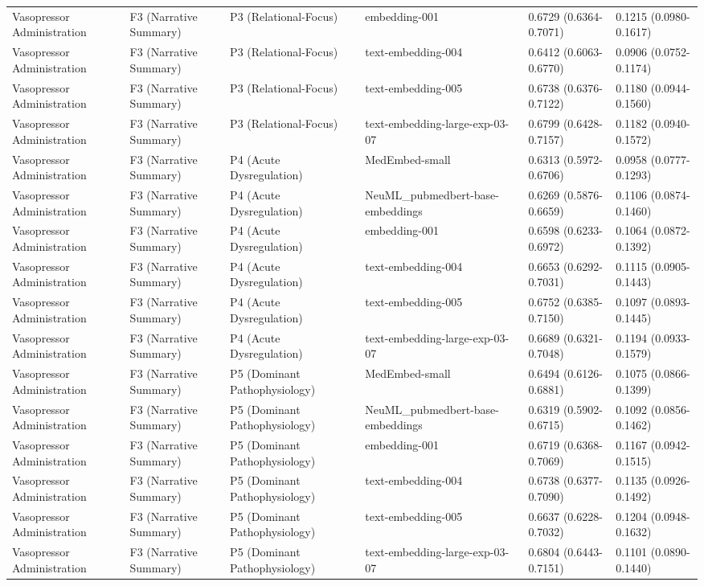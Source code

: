 \begin{tabular}{llllll}
Vasopressor Administration & F3 (Narrative Summary) & P3 (Relational-Focus) & embedding-001 & 0.6729 (0.6364-0.7071) & 0.1215 (0.0980-0.1617) \\
Vasopressor Administration & F3 (Narrative Summary) & P3 (Relational-Focus) & text-embedding-004 & 0.6412 (0.6063-0.6770) & 0.0906 (0.0752-0.1174) \\
Vasopressor Administration & F3 (Narrative Summary) & P3 (Relational-Focus) & text-embedding-005 & 0.6738 (0.6376-0.7122) & 0.1180 (0.0944-0.1560) \\
Vasopressor Administration & F3 (Narrative Summary) & P3 (Relational-Focus) & text-embedding-large-exp-03-07 & 0.6799 (0.6428-0.7157) & 0.1182 (0.0940-0.1572) \\
Vasopressor Administration & F3 (Narrative Summary) & P4 (Acute Dysregulation) & MedEmbed-small & 0.6313 (0.5972-0.6706) & 0.0958 (0.0777-0.1293) \\
Vasopressor Administration & F3 (Narrative Summary) & P4 (Acute Dysregulation) & NeuML\_pubmedbert-base-embeddings & 0.6269 (0.5876-0.6659) & 0.1106 (0.0874-0.1460) \\
Vasopressor Administration & F3 (Narrative Summary) & P4 (Acute Dysregulation) & embedding-001 & 0.6598 (0.6233-0.6972) & 0.1064 (0.0872-0.1392) \\
Vasopressor Administration & F3 (Narrative Summary) & P4 (Acute Dysregulation) & text-embedding-004 & 0.6653 (0.6292-0.7031) & 0.1115 (0.0905-0.1443) \\
Vasopressor Administration & F3 (Narrative Summary) & P4 (Acute Dysregulation) & text-embedding-005 & 0.6752 (0.6385-0.7150) & 0.1097 (0.0893-0.1445) \\
Vasopressor Administration & F3 (Narrative Summary) & P4 (Acute Dysregulation) & text-embedding-large-exp-03-07 & 0.6689 (0.6321-0.7048) & 0.1194 (0.0933-0.1579) \\
Vasopressor Administration & F3 (Narrative Summary) & P5 (Dominant Pathophysiology) & MedEmbed-small & 0.6494 (0.6126-0.6881) & 0.1075 (0.0866-0.1399) \\
Vasopressor Administration & F3 (Narrative Summary) & P5 (Dominant Pathophysiology) & NeuML\_pubmedbert-base-embeddings & 0.6319 (0.5902-0.6715) & 0.1092 (0.0856-0.1462) \\
Vasopressor Administration & F3 (Narrative Summary) & P5 (Dominant Pathophysiology) & embedding-001 & 0.6719 (0.6368-0.7069) & 0.1167 (0.0942-0.1515) \\
Vasopressor Administration & F3 (Narrative Summary) & P5 (Dominant Pathophysiology) & text-embedding-004 & 0.6738 (0.6377-0.7090) & 0.1135 (0.0926-0.1492) \\
Vasopressor Administration & F3 (Narrative Summary) & P5 (Dominant Pathophysiology) & text-embedding-005 & 0.6637 (0.6228-0.7032) & 0.1204 (0.0948-0.1632) \\
Vasopressor Administration & F3 (Narrative Summary) & P5 (Dominant Pathophysiology) & text-embedding-large-exp-03-07 & 0.6804 (0.6443-0.7151) & 0.1101 (0.0890-0.1440) \\
\bottomrule
\end{tabular}
